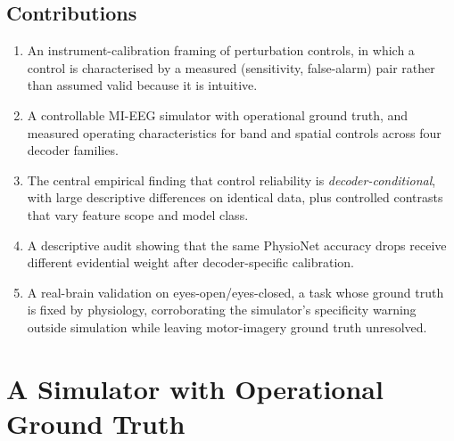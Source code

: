 \documentclass[manuscript,nonacm]{acmart}
\begin{document}
\subsection{Contributions}
\begin{enumerate}
\item An instrument-calibration framing of perturbation controls, in which a control is
      characterised by a measured (sensitivity, false-alarm) pair rather than assumed
      valid because it is intuitive.
\item A controllable MI-EEG simulator with operational ground truth, and measured
      operating characteristics for band and spatial controls across four decoder
      families.
\item The central empirical finding that control reliability is
      \emph{decoder-conditional}, with large descriptive differences on identical data,
      plus controlled contrasts that vary feature scope and model class.
\item A descriptive audit showing that the same PhysioNet accuracy drops receive
      different evidential weight after decoder-specific calibration.
\item A real-brain validation on eyes-open/eyes-closed, a task whose ground truth is
      fixed by physiology, corroborating the simulator's specificity warning outside
      simulation while leaving motor-imagery ground truth unresolved.
\end{enumerate}

\section{A Simulator with Operational Ground Truth}
\end{document}

